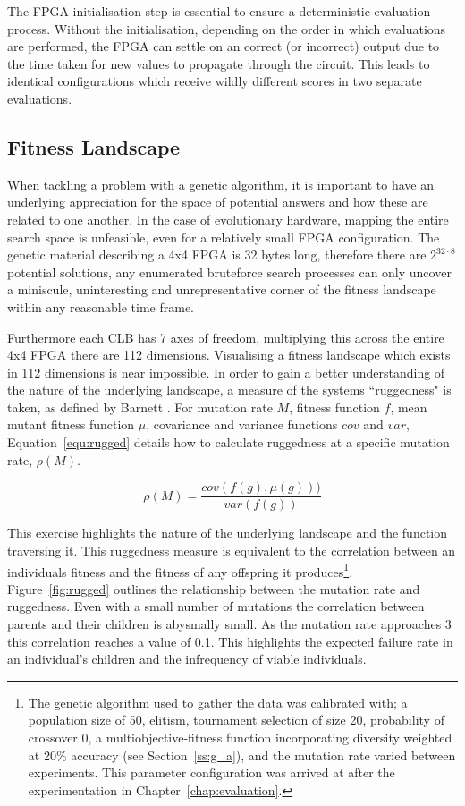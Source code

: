 The FPGA initialisation step is essential to ensure a deterministic evaluation
process. Without the initialisation, depending on the order in which evaluations
are performed, the FPGA can settle on an correct (or incorrect) output due to the
time taken for new values to propagate through the circuit. This leads to identical
configurations which receive wildly different scores in two separate evaluations.

\subsection{Fitness Landscape}

When tackling a problem with a genetic algorithm, it is important to have an underlying appreciation
for the space of potential answers and how these are related to one another.
In the case of evolutionary hardware,
mapping the entire search space is unfeasible, even for a relatively small
FPGA configuration.
The genetic material describing a 4x4 FPGA
is 32 bytes long, therefore there are $2^{32\cdot8}$ potential solutions, any
enumerated bruteforce search processes can only uncover a
miniscule, uninteresting and unrepresentative corner of the fitness landscape
within any reasonable time frame.

Furthermore each CLB has 7 axes of freedom, multiplying this across the entire 4x4 FPGA
there are 112 dimensions. Visualising a fitness landscape which exists in
112 dimensions is near impossible. In order to gain a better understanding
of the nature of the underlying landscape, a measure of the systems ``ruggedness"
is taken, as defined by Barnett \cite{barnett2008ruggedness}. For mutation rate
$M$, fitness function $f$, mean mutant fitness function $\mu$, covariance and
variance functions $cov$ and $var$, Equation~\ref{equ:rugged} details how to
calculate ruggedness at a specific mutation rate, $\rho(M)$.

\begin{equation}
	\rho(M) = \frac{cov(f(g),\mu(g)))}{var(f(g))}
	\label{equ:rugged}
\end{equation}

This exercise highlights the nature of the underlying landscape and the function
traversing it.
This ruggedness measure is equivalent to the correlation between an individuals
fitness and the fitness of any offspring it produces\footnote{The genetic algorithm
used to gather the data was calibrated with; a population
size of 50, elitism, tournament selection of size 20, probability of crossover 0,
a multiobjective-fitness function incorporating diversity weighted at 20\% accuracy
(see Section~\ref{ss:g_a}), and the mutation rate varied between experiments. This parameter
configuration was arrived at after the experimentation in Chapter~\ref{chap:evaluation}.}.
Figure~\ref{fig:rugged} outlines the relationship between the mutation rate and
ruggedness. Even with a small number of mutations the correlation between parents
and their children is abysmally small. As the mutation rate approaches 3 this correlation
reaches a value of 0.1. This highlights the expected failure rate in an individual's children
and the infrequency of viable individuals.


